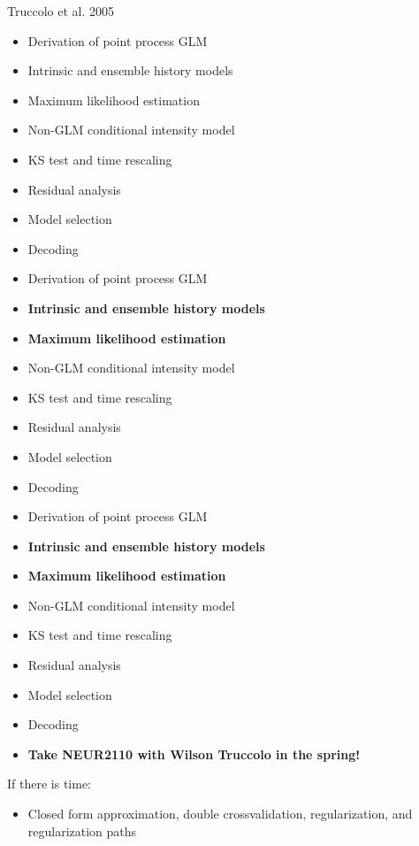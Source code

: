 \documentclass[svgnames,13pt]{beamer}
\DeclareRobustCommand{\emph}[1]{\textbf{{\color{emphasizecolor} #1}}}
\begin{document}
\begin{frame}{Truccolo et al. 2005}
\begin{overprint}
	\begin{itemize}
		\item Derivation of point process GLM
		\item Intrinsic and ensemble history models
		\item Maximum likelihood estimation
		\item Non-GLM conditional intensity model
		\item KS test and time rescaling
		\item Residual analysis
		\item Model selection
		\item Decoding
		\end{itemize}
	\begin{itemize}
		\item Derivation of point process GLM
		\item \emph{Intrinsic and ensemble history models}
		\item \emph{Maximum likelihood estimation}
		\item Non-GLM conditional intensity model
		\item KS test and time rescaling
		\item Residual analysis
		\item Model selection
		\item Decoding
		\end{itemize}
	\begin{itemize}
		\item Derivation of point process GLM
		\item \emph{Intrinsic and ensemble history models}
		\item \emph{Maximum likelihood estimation}
		\item Non-GLM conditional intensity model
		\item KS test and time rescaling
		\item Residual analysis
		\item Model selection
		\item Decoding
		\item \emph{Take NEUR2110 with Wilson Truccolo in the spring!}
		\end{itemize}
		\end{overprint}
\begin{overprint}
	If there is time:
	\begin{itemize}
		\item Closed form approximation, double crossvalidation, regularization, and regularization paths
	\end{itemize}
\end{overprint}
\end{frame} 
\end{document}
